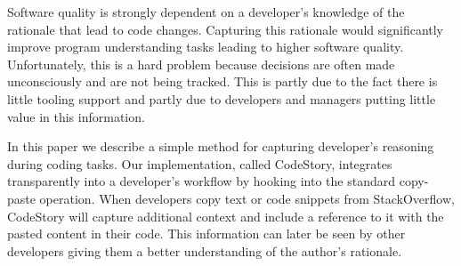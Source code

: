 \documentclass[../manifest.tex]{subfiles}
\begin{document}
Software quality is strongly dependent on a developer's knowledge of the rationale that lead to code changes. Capturing this rationale would significantly improve program understanding tasks leading to higher software quality. Unfortunately, this is a hard problem because decisions are often made unconsciously and are not being tracked. This is partly due to the fact there is little tooling support and partly due to developers and managers putting little value in this information.

In this paper we describe a simple method for capturing developer's reasoning
during coding tasks. Our implementation, called CodeStory, integrates transparently
into a developer's workflow by hooking into the standard copy-paste operation. When developers copy text or code snippets from StackOverflow, CodeStory will capture additional context and include a reference to it with the pasted content in their code. This information can later be seen by other
developers giving them a better understanding of the author's rationale.
\end{document}
